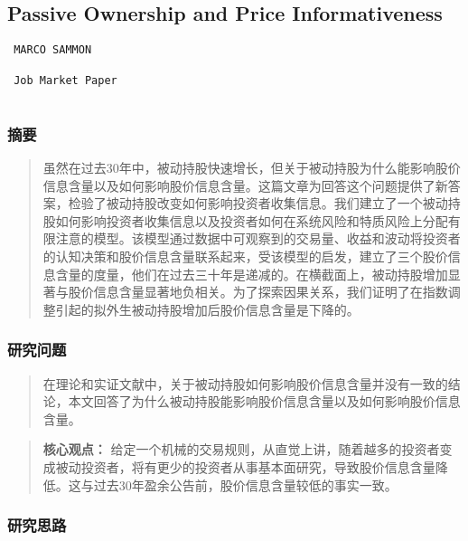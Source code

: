 \documentclass[
]{article}
\begin{document}
\hypertarget{passive-ownership-and-price-informativeness}{%
\subsection{Passive Ownership and Price
Informativeness}\label{passive-ownership-and-price-informativeness}}

\begin{verbatim}
 MARCO SAMMON
 
 Job Market Paper
 
\end{verbatim}

\hypertarget{ux6458ux8981-4}{%
\subsubsection{摘要}\label{ux6458ux8981-4}}

\begin{quote}
虽然在过去30年中，被动持股快速增长，但关于被动持股为什么能影响股价信息含量以及如何影响股价信息含量。这篇文章为回答这个问题提供了新答案，检验了被动持股改变如何影响投资者收集信息。我们建立了一个被动持股如何影响投资者收集信息以及投资者如何在系统风险和特质风险上分配有限注意的模型。该模型通过数据中可观察到的交易量、收益和波动将投资者的认知决策和股价信息含量联系起来，受该模型的启发，建立了三个股价信息含量的度量，他们在过去三十年是递减的。在横截面上，被动持股增加显著与股价信息含量显著地负相关。为了探索因果关系，我们证明了在指数调整引起的拟外生被动持股增加后股价信息含量是下降的。
\end{quote}

\hypertarget{ux7814ux7a76ux95eeux9898-4}{%
\subsubsection{研究问题}\label{ux7814ux7a76ux95eeux9898-4}}

\begin{quote}
在理论和实证文献中，关于被动持股如何影响股价信息含量并没有一致的结论，本文回答了为什么被动持股能影响股价信息含量以及如何影响股价信息含量。
\end{quote}

\begin{quote}
\textbf{核心观点：}
{给定一个机械的交易规则，从直觉上讲，随着越多的投资者变成被动投资者，将有更少的投资者从事基本面研究，导致股价信息含量降低。这与过去30年盈余公告前，股价信息含量较低的事实一致。}
\end{quote}

\hypertarget{ux7814ux7a76ux601dux8def-1}{%
\subsubsection{研究思路}\label{ux7814ux7a76ux601dux8def-1}}
\end{document}
